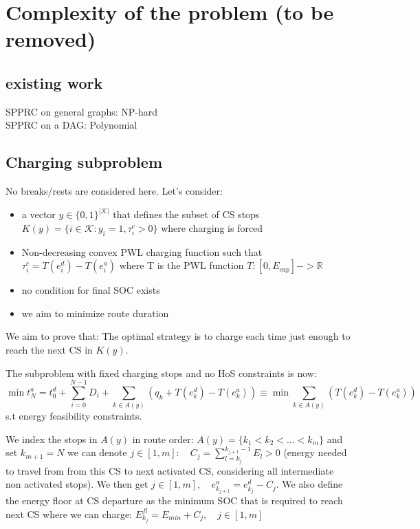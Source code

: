 \documentclass[preprint,12pt,3p]{elsarticle}
\begin{document}
{\color{red}
\section{Complexity of the problem (to be removed)}
\subsection{existing work}




SPPRC on general graphs: NP-hard \cite{dror_note_1994} \\
SPPRC on a DAG: Polynomial \cite{irnich_shortest_2005}

\subsection{Charging subproblem}
\noindent No breaks/rests are considered here. Let's consider:
\begin{itemize}
    \item a vector $y \in \{0,1\}^{|\mathcal K|}$ that defines the subset of CS stops $K(y)=\{i \in \mathcal K : y_i =1, \tau_i^c >0\}$ where charging is forced
    \item Non-decreasing convex PWL charging function such that $\tau_i^c = T(e^d_i)-T(e^a_i)$ where T is the PWL function $T:[0,E_{cap}]-> \mathbb{R}$
    \item no condition for final SOC exists
    \item we aim to minimize route duration
\end{itemize}

We aim to prove that: The optimal strategy is to charge each time just enough to reach the next CS in $K(y)$.

The subproblem with fixed charging stops and no HoS constraints is now:
\begin{equation}
    \min t^a_N=t^d_0 + \sum_{i=0}^{N-1}D_i+\sum_{k \in A(y)}(q_k+T(e^d_k)-T(e^a_k)) \equiv \min \sum_{k \in A(y)}(T(e^d_k)-T(e^a_k))
\end{equation}
s.t energy feasibility constraints.


We index the stops in $A(y)$ in route order: $A(y)=\{k_1 < k_2 < ... <k_m\}$ and set $k_{m+1}=N$
we can denote $ j \in [1,m]:\quad C_j = \sum_{l=k_j}^{k_{j+1}-1}E_l > 0$ (energy needed to travel from from this CS to next activated CS, considering all intermediate non activated stops).
We then get $ j \in [1,m],\quad e^a_{k_{j+1}} = e^d_{k_j}-C_j$.
We also define the energy floor at CS departure as the minimum SOC that is required to reach next CS where we can charge: $E_{k_j}^{fl}= E_{min} + C_j, \quad j \in [1,m]$

}
\end{document}
